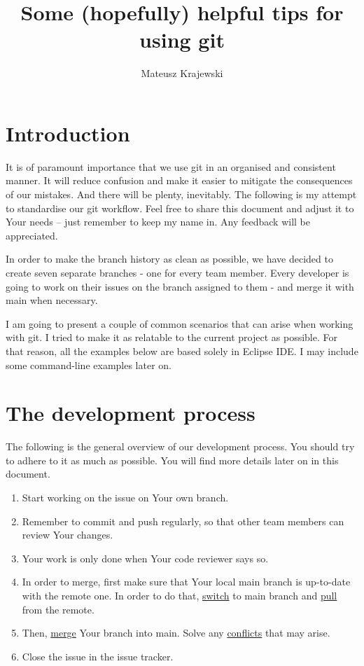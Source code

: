 \documentclass{article}
\title{Some (hopefully) helpful tips for using git}
\author{Mateusz Krajewski}
\begin{document}
\maketitle
\tableofcontents
\newpage

\section{Introduction} 
It is of paramount importance that we use git in an organised and consistent manner. It will reduce confusion and make it easier to mitigate the consequences of our mistakes. And there will be plenty, inevitably. The following is my attempt to standardise our git workflow. Feel free to share this document and adjust it to Your needs -- just remember to keep my name in. Any feedback will be appreciated.

In order to make the branch history as clean as possible, we have decided to create seven separate branches - one for every team member. Every developer is going to work on their issues on the branch assigned to them - and merge it with main when necessary.

I am going to present a couple of common scenarios that can arise when working with git. I tried to make it as relatable to the current project as possible. For that reason, all the examples below are based solely in Eclipse IDE. I may include some command-line examples later on.

\section{The development process}

The following is the general overview of our development process. You should try to adhere to it as much as possible. You will find more details later on in this document.

\begin{enumerate}
	\item Start working on the issue on Your own branch.
	\item Remember to commit and push regularly, so that other team members can review Your changes.
	\item Your work is only done when Your code reviewer says so.
	\item In order to merge, first make sure that Your local main branch is up-to-date with the remote one. In order to do that, \hyperref[sec:switching]{switch} to main branch and \hyperref[sec:pulling]{pull} from the remote.
	\item Then, \hyperref[sec:merging]{merge} Your branch into main. Solve any \hyperref[sec:conflicts]{conflicts} that may arise.
	\item Close the issue in the issue tracker.
\end{enumerate}
\end{document}

